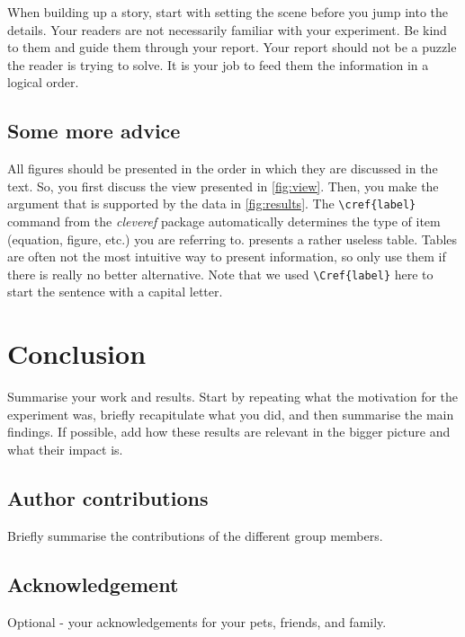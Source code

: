 \documentclass{AEM4602Wreport}
\begin{document}
When building up a story, start with setting the scene before you jump into the details.
Your readers are not necessarily familiar with your experiment.
Be kind to them and guide them through your report.
Your report should not be a puzzle the reader is trying to solve.
It is your job to feed them the information in a logical order.


\subsection{Some more advice}
All figures should be presented in the order in which they are discussed in the text.
So, you first discuss the view presented in \cref{fig:view}.
Then, you make the argument that is supported by the data in \cref{fig:results}.
The \verb+\cref{label}+ command from the \textit{cleveref} package automatically determines the type of item (equation, figure, etc.) you are referring to.
 presents a rather useless table.
Tables are often not the most intuitive way to present information, so only use them if there is really no better alternative.
Note that we used \verb+\Cref{label}+ here to start the sentence with a capital letter.

\section{Conclusion}
Summarise your work and results.
Start by repeating what the motivation for the experiment was, briefly recapitulate what you did, and then summarise the main findings.
If possible, add how these results are relevant in the bigger picture and what their impact is.

\subsection{Author contributions}
Briefly summarise the contributions of the different group members.

\subsection{Acknowledgement}
Optional - your acknowledgements for your pets, friends, and family.

\printbibliography



\end{document}

